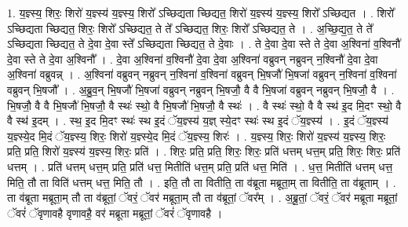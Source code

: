 \documentclass[17pt]{extarticle}
\begin{document}
1. य॒ज्ञ्स्य॒ शिरः॒ शिरो॑ य॒ज्ञ्स्य॑ य॒ज्ञ्स्य॒ शिरो᳚ ऽच्छिद्यता च्छिद्यत॒ शिरो॑ य॒ज्ञ्स्य॑ य॒ज्ञ्स्य॒ शिरो᳚ ऽच्छिद्यत । . शिरो᳚ ऽच्छिद्यता च्छिद्यत॒ शिरः॒ शिरो᳚ ऽच्छिद्यत॒ ते ते᳚ ऽच्छिद्यत॒ शिरः॒ शिरो᳚ ऽच्छिद्यत॒ ते । . अ॒च्छि॒द्य॒त॒ ते ते᳚ ऽच्छिद्यता च्छिद्यत॒ ते दे॒वा दे॒वा स्ते᳚ ऽच्छिद्यता च्छिद्यत॒ ते दे॒वाः । . ते दे॒वा दे॒वा स्ते ते दे॒वा अ॒श्विना॑ व॒श्विनौ॑ दे॒वा स्ते ते दे॒वा अ॒श्विनौ᳚ । . दे॒वा अ॒श्विना॑ व॒श्विनौ॑ दे॒वा दे॒वा अ॒श्विना॑ वब्रुवन् नब्रुवन् न॒श्विनौ॑ दे॒वा दे॒वा अ॒श्विना॑ वब्रुवन्न् । . अ॒श्विना॑ वब्रुवन् नब्रुवन् न॒श्विना॑ व॒श्विना॑ वब्रुवन् भि॒षजौ॑ भि॒षजा॑ वब्रुवन् न॒श्विना॑ व॒श्विना॑ वब्रुवन् भि॒षजौ᳚ । . अ॒ब्रु॒व॒न् भि॒षजौ॑ भि॒षजा॑ वब्रुवन् नब्रुवन् भि॒षजौ॒ वै वै भि॒षजा॑ वब्रुवन् नब्रुवन् भि॒षजौ॒ वै । . भि॒षजौ॒ वै वै भि॒षजौ॑ भि॒षजौ॒ वै स्थः॑ स्थो॒ वै भि॒षजौ॑ भि॒षजौ॒ वै स्थः॑ । . वै स्थः॑ स्थो॒ वै वै स्थ॑ इ॒द मि॒दꣳ स्थो॒ वै वै स्थ॑ इ॒दम् । . स्थ॒ इ॒द मि॒दꣳ स्थः॑ स्थ इ॒दं ॅय॒ज्ञ्स्य॑ य॒ज्ञ् स्ये॒दꣳ स्थः॑ स्थ इ॒दं ॅय॒ज्ञ्स्य॑ । . इ॒दं ॅय॒ज्ञ्स्य॑ य॒ज्ञ्स्ये॒द मि॒दं ॅय॒ज्ञ्स्य॒ शिरः॒ शिरो॑ य॒ज्ञ्स्ये॒द मि॒दं ॅय॒ज्ञ्स्य॒ शिरः॑ । . य॒ज्ञ्स्य॒ शिरः॒ शिरो॑ य॒ज्ञ्स्य॑ य॒ज्ञ्स्य॒ शिरः॒ प्रति॒ प्रति॒ शिरो॑ य॒ज्ञ्स्य॑ य॒ज्ञ्स्य॒ शिरः॒ प्रति॑ । . शिरः॒ प्रति॒ प्रति॒ शिरः॒ शिरः॒ प्रति॑ धत्तम् धत्त॒म् प्रति॒ शिरः॒ शिरः॒ प्रति॑ धत्तम् । . प्रति॑ धत्तम् धत्त॒म् प्रति॒ प्रति॑ धत्त॒ मितीति॑ धत्त॒म् प्रति॒ प्रति॑ धत्त॒ मिति॑ । . ध॒त्त॒ मितीति॑ धत्तम् धत्त॒ मिति॒ तौ ता विति॑ धत्तम् धत्त॒ मिति॒ तौ । . इति॒ तौ ता वितीति॒ ता व॑ब्रूता मब्रूता॒म् ता वितीति॒ ता व॑ब्रूताम् । . ता व॑ब्रूता मब्रूता॒म् तौ ता व॑ब्रूतां॒ ॅवरं॒ ॅवर॑ मब्रूता॒म् तौ ता व॑ब्रूतां॒ ॅवर᳚म् । . अ॒ब्रू॒तां॒ ॅवरं॒ ॅवर॑ मब्रूता मब्रूतां॒ ॅवरं॑ ॅवृणावहै वृणावहै॒ वर॑ मब्रूता मब्रूतां॒ ॅवरं॑ ॅवृणावहै । \newline
\end{document}
